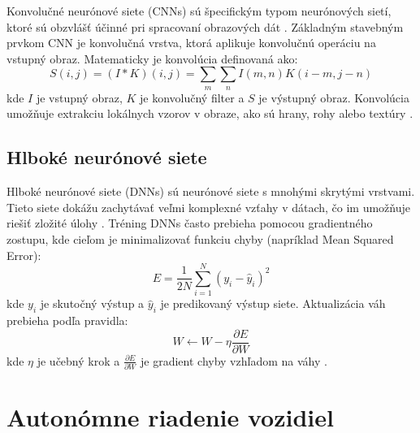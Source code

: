 Konvolučné neurónové siete (CNNs) sú špecifickým typom neurónových sietí, ktoré sú obzvlášť účinné pri spracovaní obrazových dát \cite{artificial_intelligence_modern_aproach}. Základným stavebným prvkom CNN je konvolučná vrstva, ktorá aplikuje konvolučnú operáciu na vstupný obraz. Matematicky je konvolúcia definovaná ako:
\[
S(i,j) = (I * K)(i,j) = \sum_m \sum_n I(m,n) K(i-m, j-n)
\]
kde $I$ je vstupný obraz, $K$ je konvolučný filter a $S$ je výstupný obraz. Konvolúcia umožňuje extrakciu lokálnych vzorov v obraze, ako sú hrany, rohy alebo textúry \cite{krizhevsky2012imagenet}.

\subsection{Hlboké neurónové siete}

Hlboké neurónové siete (DNNs) sú neurónové siete s mnohými skrytými vrstvami. Tieto siete dokážu zachytávať veľmi komplexné vzťahy v dátach, čo im umožňuje riešiť zložité úlohy \cite{goodfellow2016deep}. Tréning DNNs často prebieha pomocou gradientného zostupu, kde cieľom je minimalizovať funkciu chyby (napríklad Mean Squared Error):
\[
E = \frac{1}{2N} \sum_{i=1}^N (y_i - \hat{y}_i)^2
\]
kde $y_i$ je skutočný výstup a $\hat{y}_i$ je predikovaný výstup siete. Aktualizácia váh prebieha podľa pravidla:
\[
W \leftarrow W - \eta \frac{\partial E}{\partial W}
\]
kde $\eta$ je učebný krok a $\frac{\partial E}{\partial W}$ je gradient chyby vzhľadom na váhy \cite{goodfellow2016deep}.


\section{Autonómne riadenie vozidiel}
\label{sec:autonomne_auta}

